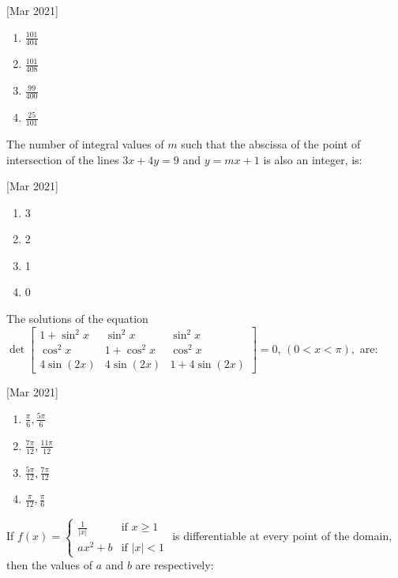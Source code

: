 			\hfill{[Mar 2021]}
			\begin{multicols}{4}
                \begin{enumerate}
    \item $\frac{101}{404}$
    \item $\frac{101}{408}$
    \item $\frac{99}{400}$
    \item $\frac{25}{101}$
                \end{enumerate}
			\end{multicols}
	\item
		The number of integral values of $m$ such that the abscissa of the point of intersection of the lines $3x + 4y = 9$ and $y = mx + 1$ is also an integer, is:

			\hfill{[Mar 2021]}
			\begin{multicols}{4}
                \begin{enumerate}
    \item 3
    \item 2
    \item 1
    \item 0
                \end{enumerate}
			\end{multicols}
	\item
		The solutions of the equation $ \det\begin{bmatrix}
1 + \sin^2 x & \sin^2 x & \sin^2 x \\
\cos^2 x & 1 + \cos^2 x & \cos^2 x \\
4\sin(2x) & 4\sin(2x) & 1 + 4\sin(2x)
		\end{bmatrix} = 0 $, $(0 < x < \pi),$ are:

			\hfill{[Mar 2021]}
			\begin{multicols}{2}
		\begin{enumerate}
    \item $ \frac{\pi}{6}, \frac{5\pi}{6} $
    \item $ \frac{7\pi}{12}, \frac{11\pi}{12} $
    \item $ \frac{5\pi}{12}, \frac{7\pi}{12} $
    \item $ \frac{\pi}{12}, \frac{\pi}{6} $
                \end{enumerate}
			\end{multicols}
	\item
			If $f(x) = \begin{cases} \frac{1}{|x|} & \text{if } x \geq 1 \\ ax^2 + b & \text{if } |x| < 1 \end{cases}$ is differentiable at every point of the domain, then the values of $a$ and $b$ are respectively:


